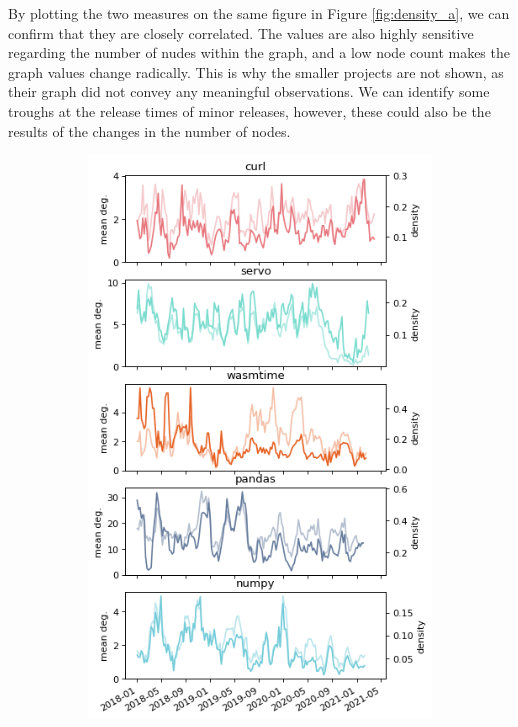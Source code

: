 By plotting the two measures on the same figure in Figure \ref{fig:density_a}, we can confirm that they are closely correlated. The values are also highly sensitive regarding the number of nudes within the graph, and a low node count makes the graph values change radically. This is why the smaller projects are not shown, as their graph did not convey any meaningful observations. We can identify some troughs at the release times of minor releases, however, these could also be the results of the changes in the number of nodes.

\begin{figure}
    \centering
    \begin{subfigure}{0.53\textwidth}
        \centering
        \includegraphics[width=\textwidth]{figures/qualitative/mean_deg_density/mean_deg.png}

\end{subfigure}
\end{figure}
